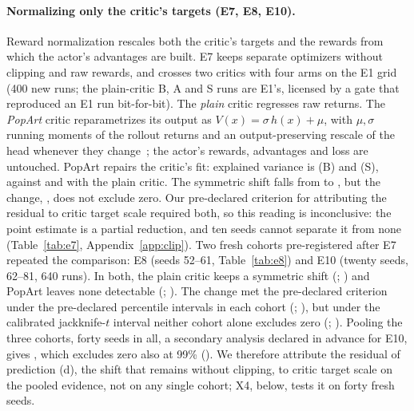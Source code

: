 \paragraph{Normalizing only the critic's targets (E7, E8, E10).}
Reward normalization rescales both the critic's targets and the rewards from which the actor's advantages
are built. E7 keeps separate optimizers without clipping and raw rewards, and crosses two critics with four
arms on the E1 grid (400 new runs; the plain-critic B, A and S runs are E1's, licensed by a gate that
reproduced an E1 run bit-for-bit). The \emph{plain} critic regresses raw returns. The \emph{PopArt} critic
reparametrizes its output as $V(x)=\sigma\,h(x)+\mu$, with $\mu,\sigma$ running moments of the rollout returns
and an output-preserving rescale of the head whenever they change~\citep{vanhasselt2016popart}; the actor's
rewards, advantages and loss are untouched. PopArt repairs the critic's fit: explained variance is
\VsevenEVPopB{} (B) and \VsevenEVPopS{} (S), against \VsevenEVPlainB{} and \VsevenEVPlainS{} with the plain
critic. The symmetric shift falls from \VsevenSymPlain{} to \VsevenSymPop{}, but the change, \VsevenSymChange{},
does not exclude zero. Our pre-declared criterion for attributing the residual to critic target scale required
both, so this reading is inconclusive: the point estimate is a partial reduction, and ten seeds cannot
separate it from none (Table~\ref{tab:e7}, Appendix~\ref{app:clip}). Two fresh cohorts pre-registered after E7 repeated the comparison: E8
(seeds 52--61, Table~\ref{tab:e8}) and E10 (twenty seeds, 62--81, 640 runs). In both, the plain critic keeps a
symmetric shift (\VeightBSymPlain{}; \VtenSymPlain{}) and PopArt leaves none detectable (\VeightBSymPop{};
\VtenSymPop{}). The change met the pre-declared criterion under the pre-declared percentile intervals in each cohort
(\VeightBChangePct{}; \VtenChangePct{}), but under the calibrated jackknife-$t$ interval neither cohort alone excludes zero
(\VjtChEight{}; \VjtChTen{}). Pooling the three cohorts, forty seeds in all, a secondary analysis declared in advance
for E10, gives \VjtChPool{}, which excludes zero also at 99\% (\VjtChPoolNine{}). We therefore attribute the residual
of prediction (d), the shift that remains without clipping, to critic target scale on the pooled evidence, not on any
single cohort; X4, below, tests it on forty fresh seeds.

